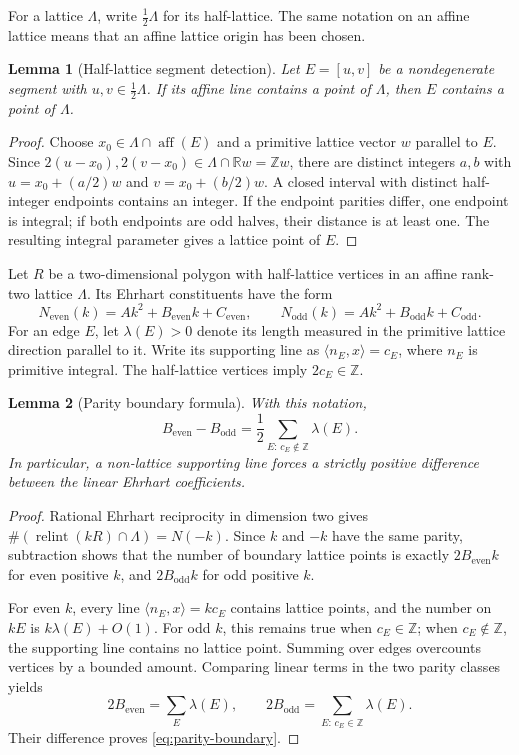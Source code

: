 \documentclass[11pt,a4paper]{article}
\newtheorem{lemma}{Lemma}[section]
\theoremstyle{definition}\newtheorem{definition}[lemma]{Definition}
\theoremstyle{remark}\newtheorem{remark}[lemma]{Remark}
\begin{document}
For a lattice $\Lambda$, write $\tfrac12\Lambda$ for its half-lattice.
The same notation on an affine lattice means that an affine lattice origin
has been chosen.

\begin{lemma}[Half-lattice segment detection]\label{lem:half-segment}
Let $E=[u,v]$ be a nondegenerate segment with
$u,v\in\tfrac12\Lambda$. If its affine line contains a point of
$\Lambda$, then $E$ contains a point of $\Lambda$.
\end{lemma}
\begin{proof}
Choose $x_0\in\Lambda\cap\operatorname{aff}(E)$ and a primitive lattice
vector $w$ parallel to $E$. Since $2(u-x_0),2(v-x_0)\in\Lambda\cap\mathbb Rw
=\mathbb Zw$, there are distinct integers $a,b$ with
$u=x_0+(a/2)w$ and $v=x_0+(b/2)w$. A closed interval with distinct
half-integer endpoints contains an integer. If the endpoint parities
differ, one endpoint is integral; if both endpoints are odd halves, their
distance is at least one. The resulting integral parameter gives a lattice
point of $E$.
\end{proof}

Let $R$ be a two-dimensional polygon with half-lattice vertices in an
affine rank-two lattice $\Lambda$. Its Ehrhart constituents have the form
\[
 N_{\mathrm{even}}(k)=Ak^2+B_{\mathrm{even}}k+C_{\mathrm{even}},\qquad
 N_{\mathrm{odd}}(k)=Ak^2+B_{\mathrm{odd}}k+C_{\mathrm{odd}}.
\]
For an edge $E$, let $\lambda(E)>0$ denote its length measured in the
primitive lattice direction parallel to it. Write its supporting line as
$\langle n_E,x\rangle=c_E$, where $n_E$ is primitive integral.
The half-lattice vertices imply $2c_E\in\mathbb Z$.

\begin{lemma}[Parity boundary formula]\label{lem:parity-boundary}
With this notation,
\begin{equation}\label{eq:parity-boundary}
 B_{\mathrm{even}}-B_{\mathrm{odd}}
   =\frac12\sum_{E:\,c_E\notin\mathbb Z}\lambda(E).
\end{equation}
In particular, a non-lattice supporting line forces a strictly positive
difference between the linear Ehrhart coefficients.
\end{lemma}
\begin{proof}
Rational Ehrhart reciprocity in dimension two gives
$\#(\operatorname{relint}(kR)\cap\Lambda)=N(-k)$. Since $k$ and $-k$
have the same parity, subtraction shows that the number of boundary
lattice points is exactly $2B_{\mathrm{even}}k$ for even positive $k$,
and $2B_{\mathrm{odd}}k$ for odd positive $k$.

For even $k$, every line
$\langle n_E,x\rangle=kc_E$ contains lattice points, and the number on
$kE$ is $k\lambda(E)+O(1)$. For odd $k$, this remains true when
$c_E\in\mathbb Z$; when $c_E\notin\mathbb Z$, the supporting line
contains no lattice point. Summing over edges overcounts vertices by a
bounded amount. Comparing linear terms in the two parity classes yields
\[
 2B_{\mathrm{even}}=\sum_E\lambda(E),\qquad
 2B_{\mathrm{odd}}=\sum_{E:\,c_E\in\mathbb Z}\lambda(E).
\]
Their difference proves \eqref{eq:parity-boundary}.
\end{proof}
\end{document}
